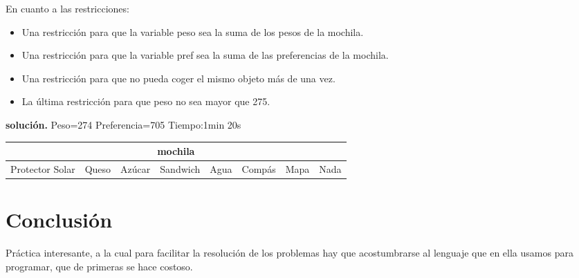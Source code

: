 \documentclass[a4paper,11pt]{article}
\begin{document}
En cuanto a las restricciones:

\begin{itemize}
\item Una restricción para que la variable peso sea la suma de los pesos de la mochila.
\item Una restricción para que la variable pref sea la suma de las preferencias de la mochila.
\item Una restricción para que no pueda coger el mismo objeto más de una vez.
\item La última restricción para que peso no sea mayor que 275.
\end{itemize}

\textbf{solución.} Peso=274 Preferencia=705 Tiempo:1min 20s

\begin{table}[h]
\begin{tabular}{|l|l|l|l|l|l|l|l|}
\hline
\multicolumn{8}{|c|}{mochila}                                             \\ \hline
Protector Solar & Queso & Azúcar & Sandwich & Agua & Compás & Mapa & Nada \\ \hline
\end{tabular}
\end{table}

\section{Conclusión}
Práctica interesante, a la cual para facilitar la resolución de los problemas hay que acostumbrarse al lenguaje que en ella usamos para programar, que de primeras se hace costoso.
\end{document}
